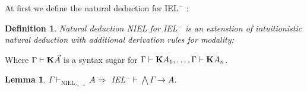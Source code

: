 \documentclass[a4paper]{article}
\newtheorem{lemma}{Lemma}
\newtheorem{defin}{Definition}
\begin{document}
  At first we define the natural deduction for IEL$^{-}$ :

  \begin{defin} Natural deduction NIEL for IEL$^{-}$ is an extenstion of intuitionistic natural deduction with additional derivation rules for modality:

  \begin{minipage}{0.5\textwidth}
    \begin{flushleft}
  	\begin{prooftree}
  \end{prooftree}
    \end{flushleft}
  \end{minipage}
  \begin{minipage}{0.5\textwidth}
    \begin{flushright}
  	\begin{prooftree}
  	\end{prooftree}
    \end{flushright}
  \end{minipage}
  \end{defin}

Where $\Gamma \vdash {\bf K} \vec{A}$ is a syntax sugar for $\Gamma \vdash {\bf K} A_1 ,\dots, \Gamma \vdash {\bf K} A_n$.

  \vspace{\baselineskip}

  \begin{lemma}
    $\Gamma \vdash_{\text{NIEL}^{-}_{\land, \to}} A \Rightarrow$ IEL$^{-} \vdash \bigwedge \Gamma \rightarrow A$.
  \end{lemma}
\end{document}
